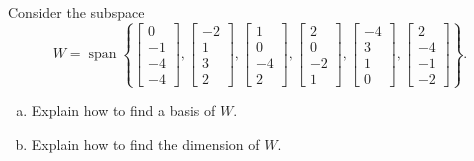 
\begin{exerciseStatement}


Consider the subspace \[W=\operatorname{span}  \left\{ \left[\begin{array}{c}
0 \\
-1 \\
-4 \\
-4
\end{array}\right] , \left[\begin{array}{c}
-2 \\
1 \\
3 \\
2
\end{array}\right] , \left[\begin{array}{c}
1 \\
0 \\
-4 \\
2
\end{array}\right] , \left[\begin{array}{c}
2 \\
0 \\
-2 \\
1
\end{array}\right] , \left[\begin{array}{c}
-4 \\
3 \\
1 \\
0
\end{array}\right] , \left[\begin{array}{c}
2 \\
-4 \\
-1 \\
-2
\end{array}\right] \right\} .\]


\begin{enumerate}[(a)]
\item  Explain how to find a basis of \(W\).
\item  Explain how to find the dimension of \(W\).
\end{enumerate}
    
\end{exerciseStatement}
    
